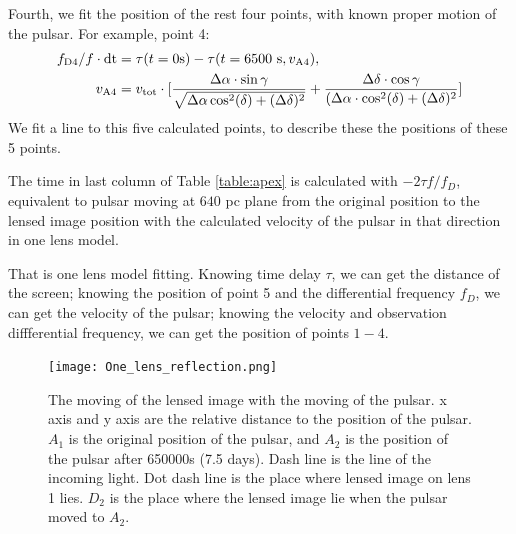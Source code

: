 \documentclass[useAMS,usenatbib]{mn2e}
\begin{document}
Fourth, we fit the position of the rest four points, with known proper motion of the pulsar. For example, point 4:
\begin{align*}
f_{\rm D4} /f\cdot{\rm dt}&=\tau(t=0 {\rm s}) -\tau(t=6500~{\rm s}, v_{\rm A4}) ,\\
v_{\rm A4} &=v_{\rm tot}\cdot[\frac{\Delta\alpha\cdot\sin{\gamma}}{\sqrt{\Delta\alpha\cos^2(\delta)+(\Delta\delta)^2}}+\frac{\Delta\delta\cdot\cos{\gamma}}{(\Delta\alpha\cdot\cos^2(\delta)+(\Delta\delta)^2}]
\end{align*}
We fit a line to this five calculated points, to describe these the positions of these 5 points. 

The time in last column of Table \ref{table:apex} is calculated with $-2{\tau}f/{f_{D}}$,
equivalent to pulsar moving at $640$ pc plane from the
original position to the lensed image position with the calculated velocity of the pulsar in that direction in one lens model.


That is one lens model fitting. Knowing time delay ${\tau}$, we can get the distance of the screen; knowing the position of point 5 and the differential frequency ${f_D}$, we can get the velocity of the pulsar; knowing the velocity and observation diffferential frequency, we can get the position of points $1-4$. %

\begin{figure}
\centering
\texttt{[image: One\_lens\_reflection.png]}
\caption{The moving of the lensed image with the moving of the pulsar. x axis and y axis are the relative distance to the position of the pulsar. $A_1$ is the original position of the pulsar, and $A_2$ is the position of the pulsar after 650000s (7.5 days). Dash line is the line of the incoming light. Dot dash line is the place where lensed image on lens 1 lies. $D_2$ is the place where the lensed image lie when the pulsar moved to $A_2$.}
\label{OneLensReflect}
\end{figure}
\end{document}
